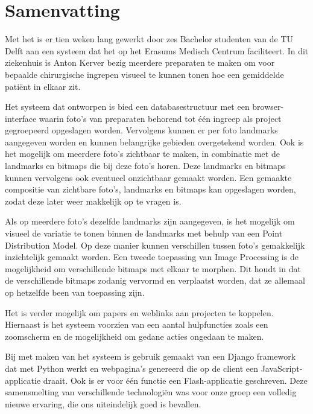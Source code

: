\section{Samenvatting}

Met het \casamproject is er tien weken lang gewerkt door zes Bachelor studenten van de TU Delft aan een systeem dat het \casamproject op het Erasums Medisch Centrum faciliteert. 
In dit ziekenhuis is Anton Kerver bezig meerdere preparaten te maken om voor bepaalde chirurgische ingrepen visueel te kunnen tonen hoe een gemiddelde pati\"{e}nt in elkaar zit.

Het systeem dat ontworpen is bied een databasestructuur met een browser-interface waarin foto's van preparaten behorend tot \'{e}\'{e}n ingreep als project gegroepeerd opgeslagen worden. 
Vervolgens kunnen er per foto landmarks aangegeven worden en kunnen belangrijke gebieden overgetekend worden.
Ook is het mogelijk om meerdere foto's zichtbaar te maken, in combinatie met de landmarks en bitmaps die bij deze foto's horen.
Deze landmarks en bitmaps kunnen vervolgens ook eventueel onzichtbaar gemaakt worden.
Een gemaakte compositie van zichtbare foto's, landmarks en bitmaps kan opgeslagen worden, zodat deze later weer makkelijk op te vragen is.

Als op meerdere foto's dezelfde landmarks zijn aangegeven, is het mogelijk om visueel de variatie te tonen binnen de landmarks met behulp van een Point Distribution Model. 
Op deze manier kunnen verschillen tussen foto's gemakkelijk inzichtelijk gemaakt worden.
Een tweede toepassing van Image Processing is de mogelijkheid om verschillende bitmaps met elkaar te morphen. 
Dit houdt in dat de verschillende bitmaps zodanig vervormd en verplaatst worden, dat ze allemaal op hetzelfde been van toepassing zijn.

Het is verder mogelijk om papers en weblinks aan projecten te koppelen.
Hiernaast is het systeem voorzien van een aantal hulpfuncties zoals een zoomscherm en de mogelijkheid om gedane acties ongedaan te maken. 

Bij met maken van het systeem is gebruik gemaakt van een Django framework dat met Python werkt en webpagina's genereerd die op de client een JavaScript-applicatie draait. 
Ook is er voor \'{e}\'{e}n functie een Flash-applicatie geschreven.
Deze samensmelting van verschillende technologi\"{e}n was voor onze groep een volledig nieuwe ervaring, die ons uiteindelijk goed is bevallen.

